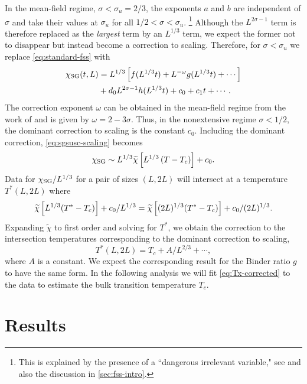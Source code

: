 In the mean-field regime, $\sigma<\sigma_u=2/3$, the exponents $a$ and $b$ are
independent of $\sigma$ and take their values at $\sigma_u$ for all
$1/2<\sigma<\sigma_u$.%
\footnote{%
  This is explained by the presence of a ``dangerous irrelevant variable," see
  \textcite{binder1985finite,luijten1999finite,jones2005finite} and also
  the discussion in \cref{sec:fss-intro}.
}
Although the $L^{2\sigma-1}$ term is therefore replaced as the \emph{largest}
term by an $L^{1/3}$ term, we expect the former not to disappear but instead
become a correction to scaling. Therefore, for $\sigma<\sigma_u$ we replace
\cref{eq:standard-fss} with
\begin{align}
  \chi_{\mathrm{SG}}(t,L)
  &= L^{1/3}\left[f(L^{1/3}t) + L^{-\omega} g(L^{1/3}t) + \cdots\right] \\
  &+ d_0 L^{2\sigma-1} h(L^{1/3}t) + c_0 + c_1 t + \cdots.
\end{align}
The correction exponent $\omega$ can be obtained in the mean-field regime from
the work of \textcite{kotliar1983one} and is given by $\omega=2-3\sigma$. Thus,
in the nonextensive regime $\sigma<1/2$, the dominant correction to scaling is
the constant $c_0$. Including the dominant correction, \cref{eq:sgsusc-scaling}
becomes
\begin{equation}
  \chi_{\mathrm{SG}} \sim L^{1/3} \widetilde{\chi}\left[L^{1/3}\left(T-T_c\right)\right] + c_0.
  \label{eq:sgsusc-scaling-corrected}
\end{equation}
Data for $\chi_{\mathrm{SG}}/L^{1/3}$ for a pair of sizes $(L,2L)$ will intersect at a
temperature $T^*(L,2L)$ where
\begin{equation}
  \widetilde{\chi}\left[L^{1/3}(T^*-T_c)\right] + c_0/L^{1/3}
  =\widetilde{\chi}\left[(2L)^{1/3}(T^*-T_c)\right] + c_0/(2L)^{1/3}.
\end{equation}
Expanding $\widetilde{\chi}$ to first order and solving for $T^*$, we obtain
the correction to the intersection temperatures corresponding to the dominant
correction to scaling,
\begin{equation}
  T^*(L,2L) = T_c + A/L^{2/3} + \cdots,
  \label{eq:Tx-corrected}
\end{equation}
where $A$ is a constant. We expect the corresponding result for the Binder
ratio $g$ to have the same form.
In the following analysis we will fit \cref{eq:Tx-corrected} to the data to
estimate the bulk transition temperature $T_c$.


\section{Results}

